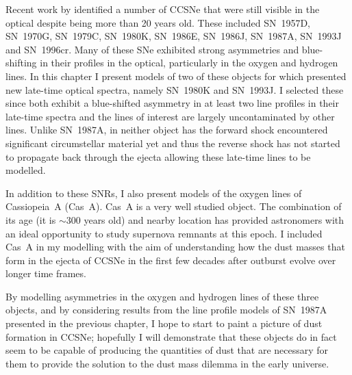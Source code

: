 Recent work by \citet{Milisavljevic2012} identified a number of CCSNe that were still visible in the optical despite being more than 20 years old.  These included SN~1957D, SN~1970G, SN~1979C, SN~1980K, SN~1986E, SN~1986J, SN~1987A, SN~1993J and SN~1996cr.  Many of these SNe exhibited strong asymmetries and blue-shifting in their profiles in the optical, particularly in the oxygen and hydrogen lines.  In this chapter I present models of two of these objects for which \citet{Milisavljevic2012} presented new late-time optical spectra, namely SN~1980K and SN~1993J.  I selected these since both exhibit a blue-shifted asymmetry in at least two line profiles in their late-time spectra and the lines of interest are largely uncontaminated by other lines.  Unlike SN~1987A, in neither object has the forward shock encountered significant circumstellar material yet and thus the reverse shock has not  started to propagate back through the ejecta allowing these late-time lines to be modelled.

In addition to these SNRs, I also present models of the oxygen lines of Cassiopeia~A (Cas~A).  Cas~A is a very well studied object.  The combination of its age (it is $\sim300$ years old) and nearby location has provided astronomers with an ideal opportunity to study supernova remnants at this epoch.  I included Cas~A in my modelling with the aim of understanding how the dust masses that form in the ejecta of CCSNe in the first few decades after outburst evolve over longer time frames. 

By modelling asymmetries in the oxygen and hydrogen lines of these three objects, and by considering results from the line profile models of SN~1987A presented in the previous chapter, I hope to start to paint a picture of dust formation in CCSNe;  hopefully I will demonstrate that these objects do in fact seem to be capable of producing the quantities of dust that are necessary for them to provide the solution to the dust mass dilemma in the early universe.

